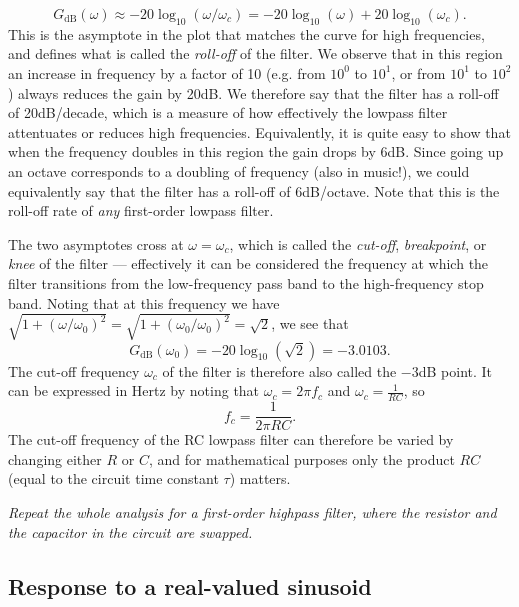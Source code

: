 \documentclass[10pt]{beamer}
\begin{document}
\begin{equation*}
  G_{\text{dB}}(\omega) \approx -20 \log_{10} (\omega/\omega_c)
  = -20 \log_{10} (\omega) + 20 \log_{10}(\omega_c).
\end{equation*}
This is the asymptote in the plot that matches the curve for high frequencies, and defines what is called the {\em roll-off} of the filter.  We observe that in this region an increase in frequency by a factor of 10 (e.g. from $10^0$ to $10^1$, or from $10^1$ to $10^2$) always reduces the gain by 20dB.  We therefore say that the filter has a roll-off of  20dB/decade, which is a measure of how effectively the lowpass filter attentuates or reduces high frequencies.  Equivalently, it is quite easy to show that when the frequency doubles in this region the gain drops by 6dB.  Since going up an octave corresponds to a doubling of frequency (also in music!), we could equivalently say that the filter has a roll-off of 6dB/octave.  Note that this is the roll-off rate of {\em any} first-order lowpass filter.

The two asymptotes cross at $\omega = \omega_c$, which is called the {\em cut-off}, {\em breakpoint}, or {\em knee} of the filter --- effectively it can be considered the frequency at which the filter transitions from the low-frequency pass band to the high-frequency stop band.  Noting that at this frequency we have $\sqrt{1 + (\omega/\omega_0)^2} = \sqrt{1 + (\omega_0/\omega_0)^2} = \sqrt{2}$, we see that
\begin{equation*}
  G_{\text{dB}}(\omega_0) = -20 \log_{10}(\sqrt{2}) = -3.0103.
\end{equation*}
The cut-off frequency $\omega_c$ of the filter is therefore also called the $-3$dB point.  It can be expressed in Hertz by noting that $\omega_c = 2 \pi f_c$ and $\omega_c = \frac{1}{RC}$, so
\begin{equation*}
  f_c  = \frac{1}{2 \pi RC}.
\end{equation*}
The cut-off frequency of the RC lowpass filter can therefore be varied by changing either $R$ or $C$, and for mathematical purposes only the product $RC$ (equal to the circuit time constant $\tau$) matters.

{\em Repeat the whole analysis for a first-order highpass filter, where the resistor and the capacitor in the circuit are swapped.}

\subsection{Response to a real-valued sinusoid}
\end{document}
